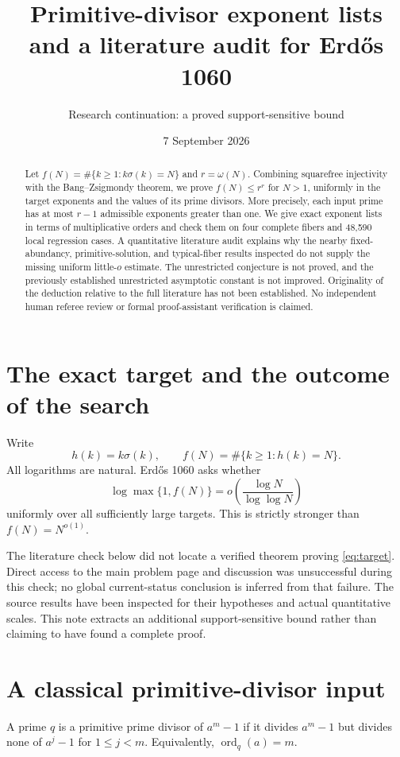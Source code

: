 \documentclass[11pt]{article}
\title{Primitive-divisor exponent lists\texorpdfstring{\\}{ }and a literature audit for Erd\H{o}s 1060}
\author{Research continuation: a proved support-sensitive bound}
\date{7 September 2026}
\DeclareMathOperator{\ord}{ord}
\begin{document}
\maketitle
\begin{abstract}
Let $f(N)=\#\{k\ge1:k\sigma(k)=N\}$ and $r=\omega(N)$. Combining squarefree injectivity with the Bang--Zsigmondy theorem, we prove $f(N)\le r^r$ for $N>1$, uniformly in the target exponents and the values of its prime divisors. More precisely, each input prime has at most $r-1$ admissible exponents greater than one. We give exact exponent lists in terms of multiplicative orders and check them on four complete fibers and 48,590 local regression cases. A quantitative literature audit explains why the nearby fixed-abundancy, primitive-solution, and typical-fiber results inspected do not supply the missing uniform little-$o$ estimate. The unrestricted conjecture is not proved, and the previously established unrestricted asymptotic constant is not improved. Originality of the deduction relative to the full literature has not been established. No independent human referee review or formal proof-assistant verification is claimed.
\end{abstract}

\section{The exact target and the outcome of the search}
Write
\[
 h(k)=k\sigma(k),\qquad f(N)=\#\{k\ge1:h(k)=N\}.
\]
All logarithms are natural. Erd\H{o}s 1060 asks whether
\begin{equation}\label{eq:target}
 \log\max\{1,f(N)\}=o\!\left(\frac{\log N}{\log\log N}\right)
\end{equation}
uniformly over all sufficiently large targets. This is strictly stronger than $f(N)=N^{o(1)}$.

The literature check below did not locate a verified theorem proving \eqref{eq:target}. Direct access to the main problem page and discussion was unsuccessful during this check; no global current-status conclusion is inferred from that failure. The source results have been inspected for their hypotheses and actual quantitative scales. This note extracts an additional support-sensitive bound rather than claiming to have found a complete proof.

\section{A classical primitive-divisor input}
A prime $q$ is a primitive prime divisor of $a^m-1$ if it divides $a^m-1$ but divides none of $a^j-1$ for $1\le j<m$. Equivalently, $\ord_q(a)=m$.
\end{document}
